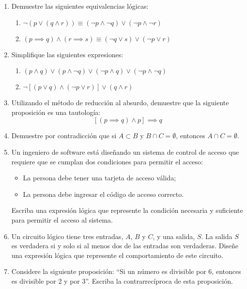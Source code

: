 \begin{enumerate}[label=\textbf{\arabic*}.]
	\item Demuestre las siguientes equivalencias lógicas:
	\begin{enumerate}[label=\alph*)]
		\item $ \neg(p \lor (q \land r)) \equiv (\neg p \land \neg q) \lor (\neg p \land \neg r)$
		\item $(p \implies q) \land (r \implies s) \equiv (\neg q \lor s) \lor (\neg p \lor r)$
	\end{enumerate}
	
	\item Simplifique las siguientes expresiones:
	\begin{enumerate}[label=\alph*)]
		\item \( (p \land q) \lor (p \land \neg q) \lor (\neg p \land q) \lor (\neg p \land \neg q) \)
		\item $\neg [(p \lor q) \land (\neg p \lor r)] \lor (q \land r)$
	\end{enumerate}
	
	\item Utilizando el método de reducción al absurdo, demuestre que la siguiente proposición es una tautología:
	\[ \left[(p \implies q) \land p\right] \implies q \]
	
	\item Demuestre por contradicción que si $A \subset B$ y $B \cap C=\emptyset$, entonces $A \cap C= \emptyset$.
	
	\item Un ingeniero de software está diseñando un sistema de control de acceso que requiere que se cumplan dos condiciones para permitir el acceso:
	
	\begin{itemize}[itemsep=-2pt]
		\item La persona debe tener una tarjeta de acceso válida;
		\item La persona debe ingresar el código de acceso correcto.
	\end{itemize}
	Escriba una expresión lógica que represente la condición necesaria y suficiente para permitir el acceso al sistema.
	
	\item Un circuito lógico tiene tres entradas, $A$, $B$ y $C$, y una salida, $S$. La salida $S$ es verdadera si y solo si al menos dos de las entradas son verdaderas. Diseñe una expresión lógica que represente el comportamiento de este circuito.
	
	\item Considere la siguiente proposición: ``Si un número es divisible por 6, entonces es divisible por 2 y por 3''. Escriba la contrarrecíproca de esta proposición.
	

\end{enumerate}
